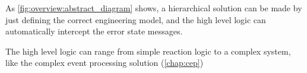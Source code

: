 As \cref{fig:overview:abstract_diagram} shows, a hierarchical solution can be made by just defining the correct engineering model, and the high level logic can automatically intercept the error state messages.

The high level logic can range from simple reaction logic to a complex system, like the complex event processing solution (\vref{chap:cep})
